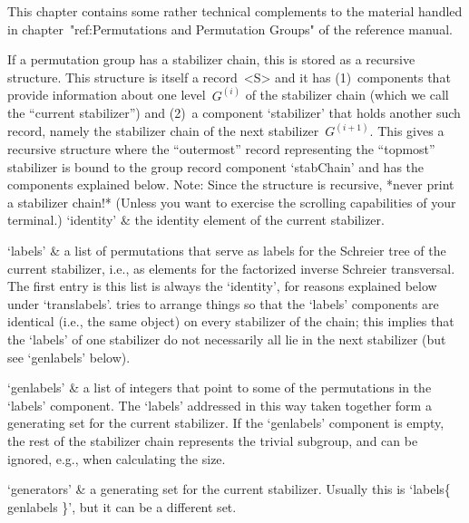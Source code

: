 
\def\labelto#1{\buildrel\lower0.8ex\hbox{$\scriptstyle #1$}\over\to}%

This  chapter contains some rather  technical complements to the material
handled  in chapter~"ref:Permutations  and   Permutation Groups"  of  the
reference manual.


If a  permutation group  has a   stabilizer chain, this   is stored  as a
recursive structure. This  structure  is itself  a record~<S>  and it has
(1)~components that provide information about  one level~$G^{(i)}$ of the
stabilizer chain (which  we call  the  ``current stabilizer'')  and (2)~a
component `stabilizer'  that  holds   another such  record,   namely  the
stabilizer chain  of    the next stabilizer~$G^{(i+1)}$.  This  gives   a
recursive  structure  where the  ``outermost''  record  representing  the
``topmost'' stabilizer is bound to the group record component `stabChain'
and   has the components explained below.    Note: Since the structure is
recursive, *never print a stabilizer chain!* (Unless you want to exercise
the scrolling capabilities of your terminal.)
\beginitems
`identity' &
        the identity element of the current stabilizer.

`labels' &
        a list of permutations that serve as labels for the Schreier tree
        of  the current stabilizer,  i.e., as elements for the factorized
        inverse Schreier transversal.  The  first entry  is this list  is
        always the  `identity',    for  reasons explained   below   under
        `translabels'.  {\GAP}  tries  to  arrange   things so  that  the
        `labels' components are  identical (i.e., the same {\GAP} object)
        on every stabilizer of the chain;  this implies that the `labels'
        of   one stabilizer  do  not  necessarily   all lie  in the  next
        stabilizer (but see `genlabels' below).

`genlabels' &
        a list of integers that point to some  of the permutations in the
        `labels' component. The    `labels' addressed in this   way taken
        together form a generating set for the current stabilizer. If the
        `genlabels' component is empty,  the rest of the stabilizer chain
        represents  the trivial subgroup, and  can be ignored, e.g., when
        calculating the size.

`generators' &
        a generating set for    the current stabilizer. Usually this   is
        `labels\{ genlabels \}', but it can be a different set.


